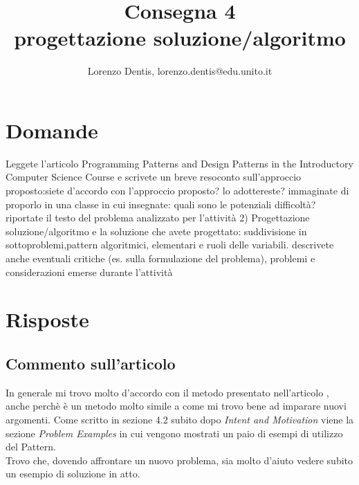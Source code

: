 \documentclass[a4paper]{article}
\begin{document}
\author{Lorenzo Dentis, lorenzo.dentis@edu.unito.it}
\title{Consegna 4 \\ \large progettazione soluzione/algoritmo}
\maketitle

\section{Domande}
Leggete l'articolo Programming Patterns and Design Patterns in the Introductory Computer Science Course e scrivete un breve resoconto sull'approccio proposto:siete d'accordo con l'approccio proposto? lo adottereste? immaginate di proporlo in una classe in cui insegnate: quali sono le potenziali difficoltà?
riportate il testo del problema analizzato per l'attività 2) Progettazione soluzione/algoritmo e la soluzione che avete progettato: suddivisione in sottoproblemi,pattern algoritmici, elementari e ruoli delle variabili.
descrivete anche eventuali critiche (es. sulla formulazione del problema), problemi e considerazioni emerse durante l'attività
\newline
\section{Risposte}
\subsection{Commento sull'articolo}
In generale mi trovo molto d'accordo con il metodo presentato nell'articolo \cite{articolo}, anche perchè è un metodo molto simile a come mi trovo bene ad imparare nuovi argomenti.
Come scritto in sezione 4.2 subito dopo \textit{Intent and Motivation} viene la sezione \textit{Problem Examples} in cui vengono mostrati un paio di esempi di utilizzo del Pattern.\\
Trovo che, dovendo affrontare un nuovo problema, sia molto d'aiuto vedere subito un esempio di soluzione in atto.
\end{document}
